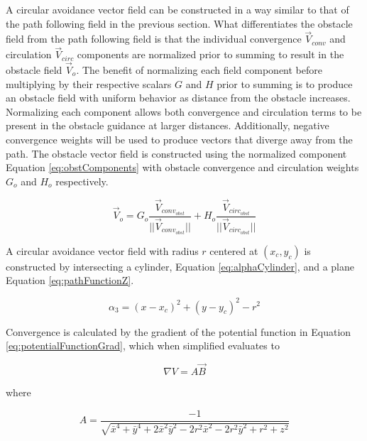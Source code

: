 \documentclass[numbered,pdftex]{ohio-etd}
\begin{document}
A circular avoidance vector field can be constructed in a way similar to that of the path following field in the previous section. What differentiates the obstacle field from the path following field is that the individual convergence $\overrightarrow{V}_{conv}$ and circulation $\overrightarrow{V}_{circ}$ components are normalized prior to summing to result in the obstacle field $\overrightarrow{V}_o$. The benefit of normalizing each field component before multiplying by their respective scalars $G$ and $H$ prior to summing is to produce an obstacle field with uniform behavior as distance from the obstacle increases. Normalizing each component allows both convergence and circulation terms to be present in the obstacle guidance at larger distances. Additionally, negative convergence weights will be used to produce vectors that diverge away from the path. The obstacle vector field is constructed using the normalized component Equation \ref{eq:obstComponents} with obstacle convergence and circulation weights $G_o$ and $H_o$ respectively.


\begin{equation}
\overrightarrow{V}_{o} = G_o\frac{\overrightarrow{V}_{conv_{obst}}}{||\overrightarrow{V}_{conv_{obst}}||}+H_o\frac{\overrightarrow{V}_{circ_{obst}}}{||\overrightarrow{V}_{circ_{obst}}||}
\label{eq:obstComponents}
\end{equation}



A circular avoidance vector field with radius $r$ centered at $(x_c,y_c)$ is constructed by intersecting a cylinder, Equation \ref{eq:alphaCylinder}, and a plane Equation \ref{eq:pathFunctionZ}. 

\begin{equation}\label{eq:alphaCylinder}
\alpha_3 = (x-x_c)^2 + (y-y_c)^2-r^2
\end{equation}


Convergence is calculated by the gradient of the potential function in Equation \ref{eq:potentialFunctionGrad}, which when simplified evaluates to

\begin{equation}
\nabla V = A\overrightarrow{B}
\label{eq:AB}
\end{equation}

\noindent
where


\begin{equation}
A = \dfrac{-1}{\sqrt{\bar{x}^4+\bar{y}^4+2\bar{x}^2\bar{y}^2-2r^2\bar{x}^2-2r^2\bar{y}^2+r^2+z^2}}
\end{equation}
\end{document}
